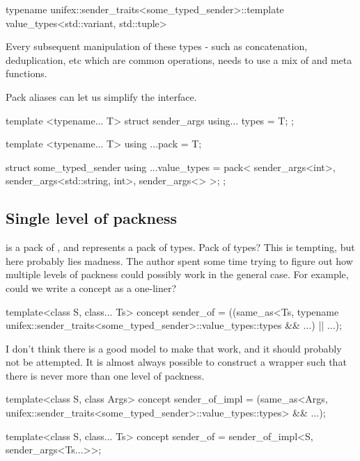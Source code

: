 \documentclass{wg21}
\begin{document}
\begin{colorblock}
    typename unifex::sender_traits<some_typed_sender>::template value_types<std::variant, std::tuple>
\end{colorblock}

Every subsequent manipulation of these types - such as concatenation, deduplication, etc which are common operations, needs to use a mix of  and  meta functions.

Pack aliases can let us simplify the interface.

\begin{colorblock}
    template <typename... T>
    struct sender_args {
        using... types = T;
    };

    template <typename... T>
    using ...pack = T;

    struct some_typed_sender {
        using ...value_types = pack<
            sender_args<int>,
            sender_args<std::string, int>,
            sender_args<>
        >;
    };
\end{colorblock}

\subsection{Single level of packness}
\label{sec:packnesslevel}

 is a pack of , and  represents a
pack of types. Pack of types?
This is tempting, but here probably lies madness.
The author spent some time trying to figure out how multiple levels of packness could possibly work in the general case. For example, could we
write a  concept as a one-liner?

\begin{colorblock}
    template<class S, class... Ts>
    concept sender_of = ((same_as<Ts,
    typename unifex::sender_traits<some_typed_sender>::value_types::types && ...) || ...);
\end{colorblock}

I don't think there is a good model to make that work, and it should probably not be attempted.
It is almost always possible to construct a wrapper such that there is never more than one level of packness.

\begin{colorblock}
    template<class S, class Args>
    concept sender_of_impl =
    (same_as<Args, unifex::sender_traits<some_typed_sender>::value_types::types> && ...);

    template<class S, class... Ts>
    concept sender_of = sender_of_impl<S, sender_args<Ts...>>;
\end{colorblock}
\end{document}

